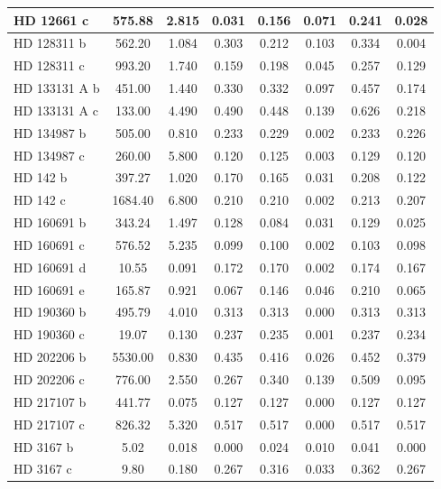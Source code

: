 \documentclass[11pt, oneside]{article}   	%
\begin{document}
\begin{longtable}{|l|c|c|c|c|c|c|c|}
HD 12661 c    & 575.88  & 2.815 & 0.031   & 0.156   & 0.071  & 0.241  & 0.028  \\ \hline
HD 128311 b   & 562.20  & 1.084 & 0.303   & 0.212   & 0.103  & 0.334  & 0.004  \\ 
HD 128311 c   & 993.20  & 1.740 & 0.159   & 0.198   & 0.045  & 0.257  & 0.129  \\ \hline
HD 133131 A b & 451.00  & 1.440 & 0.330   & 0.332   & 0.097  & 0.457  & 0.174  \\ 
HD 133131 A c & 133.00  & 4.490 & 0.490   & 0.448   & 0.139  & 0.626  & 0.218  \\ \hline
HD 134987 b   & 505.00  & 0.810 & 0.233   & 0.229   & 0.002  & 0.233  & 0.226  \\ 
HD 134987 c   & 260.00  & 5.800 & 0.120   & 0.125   & 0.003  & 0.129  & 0.120  \\ \hline
HD 142 b      & 397.27  & 1.020 & 0.170   & 0.165   & 0.031  & 0.208  & 0.122  \\ 
HD 142 c      & 1684.40 & 6.800 & 0.210   & 0.210   & 0.002  & 0.213  & 0.207  \\ \hline
HD 160691 b   & 343.24  & 1.497 & 0.128   & 0.084   & 0.031  & 0.129  & 0.025  \\ 
HD 160691 c   & 576.52  & 5.235 & 0.099   & 0.100   & 0.002  & 0.103  & 0.098  \\ 
HD 160691 d   & 10.55   & 0.091 & 0.172   & 0.170   & 0.002  & 0.174  & 0.167  \\ 
HD 160691 e   & 165.87  & 0.921 & 0.067   & 0.146   & 0.046  & 0.210  & 0.065  \\ \hline
HD 190360 b   & 495.79  & 4.010 & 0.313   & 0.313   & 0.000  & 0.313  & 0.313  \\ 
HD 190360 c   & 19.07   & 0.130 & 0.237   & 0.235   & 0.001  & 0.237  & 0.234  \\ \hline
HD 202206 b   & 5530.00 & 0.830 & 0.435   & 0.416   & 0.026  & 0.452  & 0.379  \\ 
HD 202206 c   & 776.00  & 2.550 & 0.267   & 0.340   & 0.139  & 0.509  & 0.095  \\ \hline
HD 217107 b   & 441.77  & 0.075 & 0.127   & 0.127   & 0.000  & 0.127  & 0.127  \\ 
HD 217107 c   & 826.32  & 5.320 & 0.517   & 0.517   & 0.000  & 0.517  & 0.517  \\ \hline
HD 3167 b     & 5.02    & 0.018 & 0.000   & 0.024   & 0.010  & 0.041  & 0.000  \\ 
HD 3167 c     & 9.80    & 0.180 & 0.267   & 0.316   & 0.033  & 0.362  & 0.267  \\ 

\end{longtable}
\end{document}
